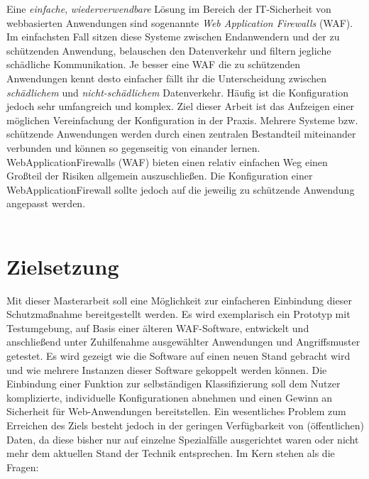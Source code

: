Eine \emph{einfache}, \emph{wiederverwendbare} Lösung im Bereich der IT-Sicherheit von webbasierten Anwendungen sind sogenannte \emph{Web Application Firewalls} (WAF). Im einfachsten Fall sitzen diese Systeme zwischen Endanwendern und der zu schützenden Anwendung, belauschen den Datenverkehr und filtern jegliche schädliche Kommunikation. Je besser eine WAF die zu schützenden Anwendungen kennt desto einfacher fällt ihr die Unterscheidung zwischen \emph{schädlichem} und \emph{nicht-schädlichem} Datenverkehr. Häufig ist die Konfiguration jedoch sehr umfangreich und komplex. Ziel dieser Arbeit ist das Aufzeigen einer möglichen Vereinfachung der Konfiguration in der Praxis. Mehrere Systeme bzw. schützende Anwendungen werden durch einen zentralen Bestandteil miteinander verbunden und können so gegenseitig von einander lernen. WebApplicationFirewalls (WAF) bieten einen relativ einfachen Weg einen Großteil der Risiken allgemein auszuschließen. Die Konfiguration einer WebApplicationFirewall sollte jedoch auf die jeweilig zu schützende Anwendung angepasst werden. \\\\


\section{Zielsetzung}

Mit dieser Masterarbeit soll eine Möglichkeit zur einfacheren Einbindung dieser Schutzmaßnahme bereitgestellt werden. Es wird exemplarisch ein Prototyp mit Testumgebung, auf Basis einer älteren WAF-Software, entwickelt und anschließend unter Zuhilfenahme ausgewählter  Anwendungen und Angriffsmuster getestet.  Es wird gezeigt wie die Software auf einen neuen Stand gebracht wird und wie mehrere Instanzen dieser Software gekoppelt werden können. Die Einbindung einer Funktion zur selbständigen Klassifizierung soll dem Nutzer komplizierte, individuelle Konfigurationen abnehmen und einen Gewinn an Sicherheit für Web-Anwendungen bereitstellen. Ein wesentliches Problem zum Erreichen des Ziels besteht jedoch in der geringen Verfügbarkeit von (öffentlichen) Daten, da diese bisher nur auf einzelne Spezialfälle ausgerichtet waren oder nicht mehr dem aktuellen Stand der Technik entsprechen. Im Kern stehen als die Fragen:

